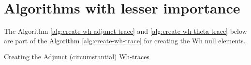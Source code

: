 \chapter{Algorithms with lesser importance}
\label{ch:extra-pseudo-code}

The Algorithm \ref{alg:create-wh-adjunct-trace} and \ref{alg:create-wh-theta-trace} below are part of the Algorithm \ref{alg:create-wh-trace} for creating the Wh null elements. 

\begin{algorithm}[!ht]
    \Input {\whGroup, \dg, \cg}
    \caption{Creating the Adjunct (circumstantial) Wh-traces}
    \label{alg:create-wh-adjunct-trace}
\end{algorithm}



